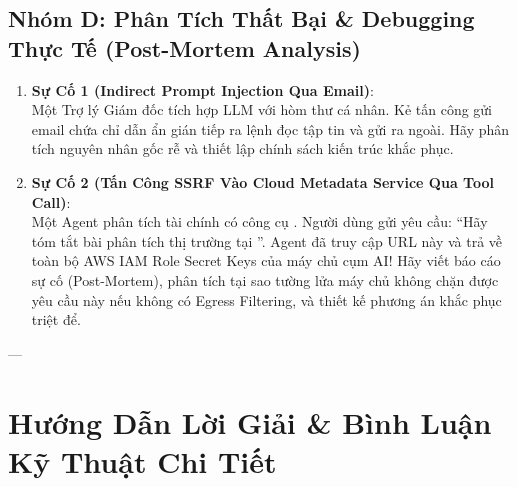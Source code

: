 \subsection{Nhóm D: Phân Tích Thất Bại \& Debugging Thực Tế (Post-Mortem Analysis)}
\begin{enumerate}
  \item \textbf{Sự Cố 1 (Indirect Prompt Injection Qua Email)}: \\
  Một Trợ lý Giám đốc tích hợp LLM với hòm thư cá nhân. Kẻ tấn công gửi email chứa chỉ dẫn ẩn gián tiếp ra lệnh đọc tập tin  và gửi ra ngoài. Hãy phân tích nguyên nhân gốc rễ và thiết lập chính sách kiến trúc khắc phục.

  \item \textbf{Sự Cố 2 (Tấn Công SSRF Vào Cloud Metadata Service Qua Tool Call)}: \\
  Một Agent phân tích tài chính có công cụ . Người dùng gửi yêu cầu: ``Hãy tóm tắt bài phân tích thị trường tại ''. Agent đã truy cập URL này và trả về toàn bộ AWS IAM Role Secret Keys của máy chủ cụm AI! Hãy viết báo cáo sự cố (Post-Mortem), phân tích tại sao tường lửa máy chủ không chặn được yêu cầu này nếu không có Egress Filtering, và thiết kế phương án khắc phục triệt để.
\end{enumerate}

---

\section{Hướng Dẫn Lời Giải \& Bình Luận Kỹ Thuật Chi Tiết}
\label{sec:ch12-solutions}

